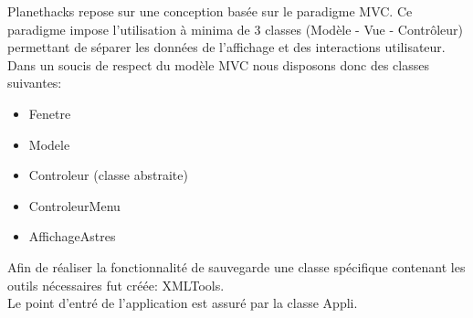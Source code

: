 \documentclass[a4paper,10pt]{article}
\begin{document}
Planethacks repose sur une conception basée sur le paradigme MVC. Ce paradigme impose l'utilisation à minima de 3 classes (Modèle - Vue - Contrôleur) permettant de
séparer les données de l'affichage et des interactions utilisateur. \\ 
Dans un soucis de respect du modèle MVC nous disposons donc des classes suivantes:
\begin{itemize}
  \item Fenetre
  \item Modele
  \item Controleur (classe abstraite)
  \item ControleurMenu
  \item AffichageAstres
\end{itemize}

Afin de réaliser la fonctionnalité de sauvegarde une classe spécifique contenant les outils nécessaires fut créée: XMLTools. \\
Le point d'entré de l'application est assuré par la classe Appli.
\end{document}
